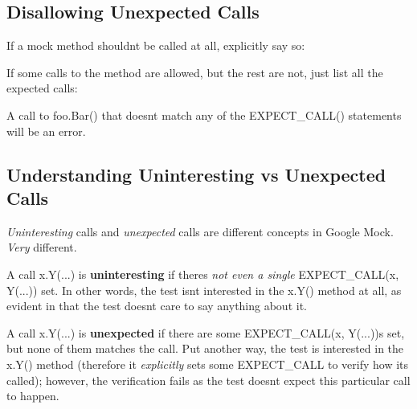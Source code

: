 \subsection*{Disallowing Unexpected Calls}

If a mock method shouldn\textquotesingle{}t be called at all, explicitly say so\+:


\begin{DoxyCode}{0}
\end{DoxyCode}


If some calls to the method are allowed, but the rest are not, just list all the expected calls\+:


\begin{DoxyCode}{0}
\end{DoxyCode}


A call to {\ttfamily foo.\+Bar()} that doesn\textquotesingle{}t match any of the {\ttfamily E\+X\+P\+E\+C\+T\+\_\+\+C\+A\+L\+L()} statements will be an error.

\subsection*{Understanding Uninteresting vs Unexpected Calls}

{\itshape Uninteresting} calls and {\itshape unexpected} calls are different concepts in Google Mock. {\itshape Very} different.

A call {\ttfamily x.\+Y(...)} is {\bfseries uninteresting} if there\textquotesingle{}s {\itshape not even a single} {\ttfamily E\+X\+P\+E\+C\+T\+\_\+\+C\+A\+L\+L(x, Y(...))} set. In other words, the test isn\textquotesingle{}t interested in the {\ttfamily x.\+Y()} method at all, as evident in that the test doesn\textquotesingle{}t care to say anything about it.

A call {\ttfamily x.\+Y(...)} is {\bfseries unexpected} if there are some {\ttfamily E\+X\+P\+E\+C\+T\+\_\+\+C\+A\+L\+L(x, Y(...))s} set, but none of them matches the call. Put another way, the test is interested in the {\ttfamily x.\+Y()} method (therefore it {\itshape explicitly} sets some {\ttfamily E\+X\+P\+E\+C\+T\+\_\+\+C\+A\+LL} to verify how it\textquotesingle{}s called); however, the verification fails as the test doesn\textquotesingle{}t expect this particular call to happen.

